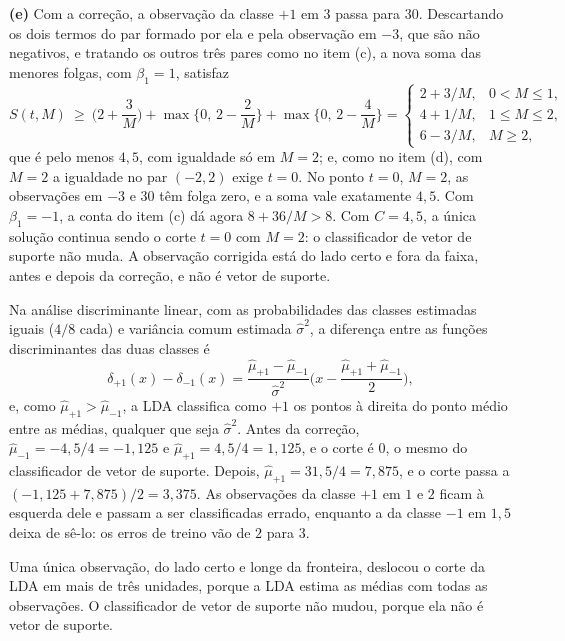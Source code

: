 \documentclass[11pt,a4paper]{article}
\begin{document}
\begin{solucao}
\smallskip
\textbf{(e)} Com a correção, a observação da classe $+1$ em $3$ passa para $30$.
Descartando os dois termos do par formado por ela e pela observação em $-3$, que são
não negativos, e tratando os outros três pares como no item (c), a nova soma das
menores folgas, com $\beta_1=1$, satisfaz
\[
  S(t,M)\ \ge\ \Big(2+\frac3M\Big)+\max\Big\{0,\,2-\frac2M\Big\}
  +\max\Big\{0,\,2-\frac4M\Big\}
  =\begin{cases}
    2+3/M, & 0<M\le1,\\
    4+1/M, & 1\le M\le2,\\
    6-3/M, & M\ge2,
  \end{cases}
\]
que é pelo menos $4{,}5$, com igualdade só em $M=2$; e, como no item (d), com $M=2$ a
igualdade no par $(-2,2)$ exige $t=0$. No ponto $t=0$, $M=2$, as observações em $-3$
e $30$ têm folga zero, e a soma vale exatamente $4{,}5$. Com $\beta_1=-1$, a conta do
item (c) dá agora $8+36/M>8$. Com $C=4{,}5$, a única solução continua sendo o corte
$t=0$ com $M=2$: o classificador de vetor de suporte não muda. A observação corrigida
está do lado certo e fora da faixa, antes e depois da correção, e não é vetor de
suporte.

Na análise discriminante linear, com as probabilidades das classes estimadas iguais
($4/8$ cada) e variância comum estimada $\widehat\sigma^2$, a diferença entre as
funções discriminantes das duas classes é
\[
  \delta_{+1}(x)-\delta_{-1}(x)
  =\frac{\widehat\mu_{+1}-\widehat\mu_{-1}}{\widehat\sigma^2}
   \Big(x-\frac{\widehat\mu_{+1}+\widehat\mu_{-1}}{2}\Big),
\]
e, como $\widehat\mu_{+1}>\widehat\mu_{-1}$, a LDA classifica como $+1$ os pontos à
direita do ponto médio entre as médias, qualquer que seja $\widehat\sigma^2$. Antes da
correção, $\widehat\mu_{-1}=-4{,}5/4=-1{,}125$ e $\widehat\mu_{+1}=4{,}5/4=1{,}125$, e
o corte é $0$, o mesmo do classificador de vetor de suporte. Depois,
$\widehat\mu_{+1}=31{,}5/4=7{,}875$, e o corte passa a
$(-1{,}125+7{,}875)/2=3{,}375$. As observações da classe $+1$ em $1$ e $2$ ficam à
esquerda dele e passam a ser classificadas errado, enquanto a da classe $-1$ em
$1{,}5$ deixa de sê-lo: os erros de treino vão de $2$ para $3$.

Uma única observação, do lado certo e longe da fronteira, deslocou o corte da LDA em
mais de três unidades, porque a LDA estima as médias com todas as observações. O
classificador de vetor de suporte não mudou, porque ela não é vetor de suporte.
\end{solucao}
\end{document}
